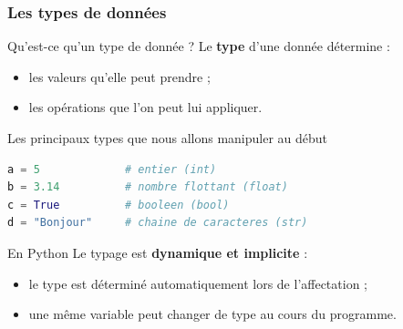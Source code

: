 \documentclass[10pt]{beamer}
\begin{document}

\begin{frame}[containsverbatim]
\frametitle{Les types de données}

\begin{block}{Qu'est-ce qu'un type de donnée ?}
Le \textbf{type} d'une donnée détermine :
\begin{itemize}
\item les valeurs qu'elle peut prendre ;
\item les opérations que l'on peut lui appliquer.
\end{itemize}
\end{block}

\vspace{0.15cm}

\begin{exampleblock}{Les principaux types que nous allons manipuler au début}
\begin{lstlisting}[language=Python]
a = 5             # entier (int)
b = 3.14          # nombre flottant (float)
c = True          # booleen (bool)
d = "Bonjour"     # chaine de caracteres (str)
\end{lstlisting}
\end{exampleblock}

\vspace{0.1cm}

\begin{block}{En Python}
Le typage est \textbf{dynamique et implicite} :
\begin{itemize}
\item le type est déterminé automatiquement lors de l'affectation ;
\item une même variable peut changer de type au cours du programme.
\end{itemize}
\end{block}
\end{frame}
\end{document}
